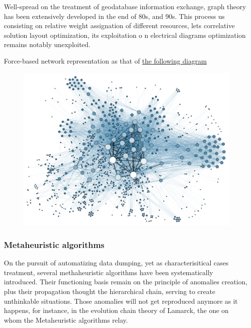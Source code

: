 Well-spread on the treatment of geodatabase information exchange, graph theory has been extensively developed in the end of 80s, and 90s. This process us consisting on relative weight assignation of different resources, lets correlative solution layout optimization, its exploitation o n electrical diagrams optimization remains notably unexploited.

Force-based network representation as that of \hyperref[fig:force-diagram]{the following diagram}

\begin{figure}[h]
    \centering
    \parbox[t]{1\textwidth}{
    {\centering
    \includegraphics[width=1\textwidth]{0.figuras/Social_Network_Analysis_Visualization.png}}
    \label{fig:force-diagram}}
\end{figure}

\subsubsection{Metaheuristic algorithms}
\label{subsub:AIG:SLV:graph_theory:meta_algorithms}

On the pursuit of automatizing data dumping, yet as characterisitical cases treatment, several methaheuristic algorithms have been systematically introduced. Their functioning basis remain on the principle of anomalies creation, plus their propagation thought the hierarchical chain, serving to create unthinkable situations. Those anomalies will not get reproduced anymore as it happens, for instance, in the evolution chain theory of Lamarck, the one on whom the Metaheuristic algorithms relay.

